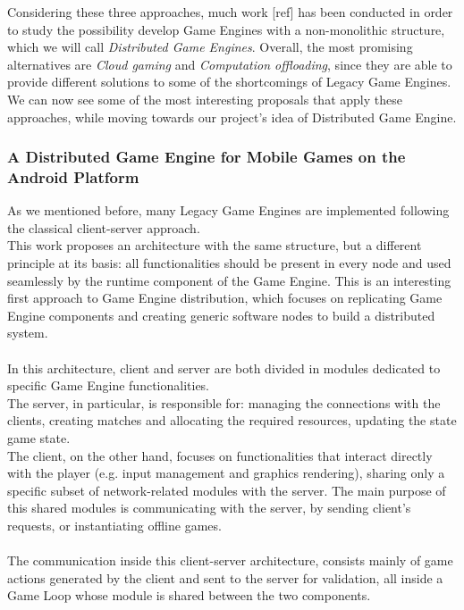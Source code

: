 Considering these three approaches, much work [ref] has been conducted in order to study the possibility develop Game Engines with a non-monolithic structure, which we will call \textit{Distributed Game Engines}.
Overall, the most promising alternatives are \textit{Cloud gaming} and \textit{Computation offloading}, since they are able to provide different solutions to some of the shortcomings of Legacy Game Engines. \\
We can now see some of the most interesting proposals that apply these approaches, while moving towards our project's idea of Distributed Game Engine.
\subsubsection{A Distributed Game Engine for Mobile Games on the Android Platform}
As we mentioned before, many Legacy Game Engines are implemented following the classical client-server approach. \\ 
This work proposes an architecture with the same structure, but a different principle at its basis: all functionalities should be present in every node and used seamlessly by the runtime component of the Game Engine. This is an interesting first approach to Game Engine distribution, which focuses on replicating Game Engine components and creating generic software nodes to build a distributed system. \\ \\
In this architecture, client and server are both divided in modules dedicated to specific Game Engine functionalities. \\ 
The server, in particular, is responsible for: managing the connections with the clients, creating matches and allocating the required resources, updating the state game state. \\
The client, on the other hand, focuses on functionalities that interact directly with the player (e.g. input management and graphics rendering), sharing only a specific subset of network-related modules with the server. The main purpose of this shared modules is communicating with the server, by sending client's requests, or instantiating offline games. \\ \\
The communication inside this client-server architecture, consists mainly of game actions generated by the client and sent to the server for validation, all inside a Game Loop whose module is shared between the two components.
